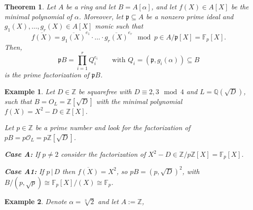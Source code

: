 \documentclass[a4paper]{book}
\theoremstyle{break}
\newtheorem{example}{Example}
\theoremstyle{plain}
\newtheorem{theorem}{Theorem}[definition]
\begin{document}
\begin{theorem}
    Let \(A\) be a ring and let \(B = A[\alpha]\), and let \(f(X) \in A[X]\) be the minimal polynomial of \(\alpha\). Moreover, let \(\mathfrak{p} \subseteq A\) be a nonzero prime ideal and \(g_1(X), \ldots, g_r(X) \in A[X]\) monic such that
    \begin{equation}
        \overline{f(X)} = \overline{g_1(X)}^{e_1} \cdot \ldots \cdot \overline{g_r(X)}^{e_r} \mod{p} \in A / \mathfrak{p} [X] = \mathbb{F}_p [X] \text{.}
    \end{equation}
    Then,
    \begin{equation}
        \mathfrak{p}B = \prod_{i=1}^r Q_i^{e_i} \qquad \text{with } Q_i = (\mathfrak{p}, g_i(\alpha)) \subseteq B
    \end{equation}
    is the prime factorization of \(\mathfrak{p}B\).
\end{theorem}

\begin{example}
    Let \(D \in \mathbb{Z}\) be squarefree with \(D \equiv 2, 3 \mod{4}\) and \(L = \mathbb{Q}(\sqrt{D})\), such that \(B = O_L = \mathbb{Z}[\sqrt{D}]\) with the minimal polynomial \(f(X) = X^2 - D \in \mathbb{Z}[X]\).

    Let \(p \in \mathbb{Z}\) be a prime number and look for the factorization of \(pB = p \mathcal{O}_L = p \mathbb{Z}[\sqrt{D}]\).

    \noindent \textbf{Case A:} If \(p \neq 2\) consider the factorization of \(X^2 - D \in \mathbb{Z} / p \mathbb{Z} [X] = \mathbb{F}_p [X]\).

    \noindent \textbf{Case A1:} If \(p \, | \, D\) then \(\overline{f(X)} = X^2\), so \(pB = (p, \sqrt{D})^2\), with \(B / (p, \sqrt{p}) \cong \mathbb{F}_p[X]/(X) \cong \mathbb{F}_p\).
\end{example}

\begin{example}
    Denote \(\alpha = \sqrt[3]{2}\) and let \(A := \mathbb{Z}\), 
\end{example}
\end{document}
